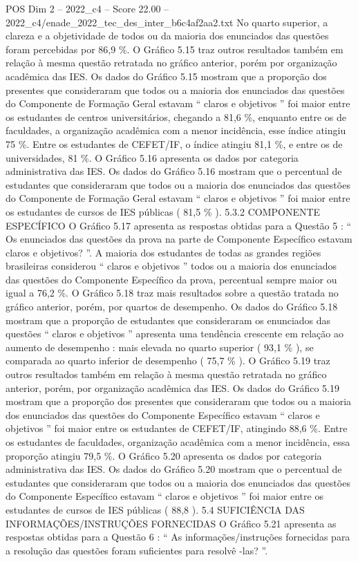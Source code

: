 \begin{textsample}{POS Dim 2 – 2022\_c4 – Score 22.00 – 2022\_c4/enade\_2022\_tec\_des\_inter\_b6c4af2aa2.txt}
No quarto superior, a clareza e a objetividade de todos ou da maioria dos enunciados das questões foram percebidas por 86,9 \%.
O Gráfico 5.15 traz outros resultados também em relação à mesma questão retratada no gráfico anterior, porém por organização acadêmica das IES.
Os dados do Gráfico 5.15 mostram que a proporção dos presentes que consideraram que todos ou a maioria dos enunciados das questões do Componente de Formação Geral estavam “ claros e objetivos ” foi maior entre os estudantes de centros universitários, chegando a 81,6 \%, enquanto entre os de faculdades, a organização acadêmica com a menor incidência, esse índice atingiu 75 \%.
Entre os estudantes de CEFET/IF, o índice atingiu 81,1 \%, e entre os de universidades, 81 \%.
O Gráfico 5.16 apresenta os dados por categoria administrativa das IES.
Os dados do Gráfico 5.16 mostram que o percentual de estudantes que consideraram que todos ou a maioria dos enunciados das questões do Componente de Formação Geral estavam “ claros e objetivos ” foi maior entre os estudantes de cursos de IES públicas ( 81,5 \% ). 5.3.2 COMPONENTE ESPECÍFICO O Gráfico 5.17 apresenta as respostas obtidas para a Questão 5 : “ Os enunciados das questões da prova na parte de Componente Específico estavam claros e objetivos? ”.
A maioria dos estudantes de todas as grandes regiões brasileiras considerou “ claros e objetivos ” todos ou a maioria dos enunciados das questões do Componente Específico da prova, percentual sempre maior ou igual a 76,2 \%.
O Gráfico 5.18 traz mais resultados sobre a questão tratada no gráfico anterior, porém, por quartos de desempenho.
Os dados do Gráfico 5.18 mostram que a proporção de estudantes que consideraram os enunciados das questões “ claros e objetivos ” apresenta uma tendência crescente em relação ao aumento de desempenho : mais elevada no quarto superior ( 93,1 \% ), se comparada ao quarto inferior de desempenho ( 75,7 \% ).
O Gráfico 5.19 traz outros resultados também em relação à mesma questão retratada no gráfico anterior, porém, por organização acadêmica das IES.
Os dados do Gráfico 5.19 mostram que a proporção dos presentes que consideraram que todos ou a maioria dos enunciados das questões do Componente Específico estavam “ claros e objetivos ” foi maior entre os estudantes de CEFET/IF, atingindo 88,6 \%.
Entre os estudantes de faculdades, organização acadêmica com a menor incidência, essa proporção atingiu 79,5 \%.
O Gráfico 5.20 apresenta os dados por categoria administrativa das IES.
Os dados do Gráfico 5.20 mostram que o percentual de estudantes que consideraram que todos ou a maioria dos enunciados das questões do Componente Específico estavam “ claros e objetivos ” foi maior entre os estudantes de cursos de IES públicas ( 88,8 ). 5.4 SUFICIÊNCIA DAS INFORMAÇÕES/INSTRUÇÕES FORNECIDAS O Gráfico 5.21 apresenta as respostas obtidas para a Questão 6 : “ As informações/instruções fornecidas para a resolução das questões foram suficientes para resolvê -las? ”.

\end{textsample}
